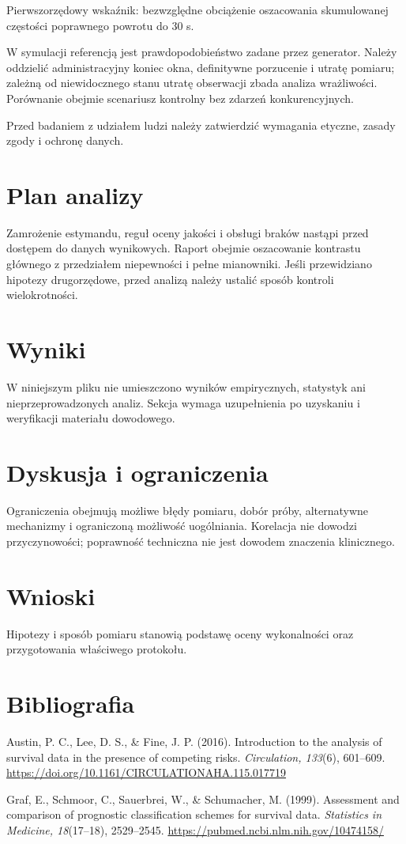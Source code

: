 \documentclass[11pt,a4paper]{article}
\begin{document}
Pierwszorzędowy wskaźnik: bezwzględne obciążenie oszacowania skumulowanej częstości poprawnego powrotu do 30 s.

W symulacji referencją jest prawdopodobieństwo zadane przez generator. Należy oddzielić administracyjny koniec okna, definitywne porzucenie i utratę pomiaru; zależną od niewidocznego stanu utratę obserwacji zbada analiza wrażliwości. Porównanie obejmie scenariusz kontrolny bez zdarzeń konkurencyjnych.

Przed badaniem z udziałem ludzi należy zatwierdzić wymagania etyczne, zasady zgody i ochronę danych.

\section{Plan analizy}

Zamrożenie estymandu, reguł oceny jakości i obsługi braków nastąpi przed dostępem do danych wynikowych. Raport obejmie oszacowanie kontrastu głównego z przedziałem niepewności i pełne mianowniki. Jeśli przewidziano hipotezy drugorzędowe, przed analizą należy ustalić sposób kontroli wielokrotności.

\section{Wyniki}

W niniejszym pliku nie umieszczono wyników empirycznych, statystyk ani nieprzeprowadzonych analiz. Sekcja wymaga uzupełnienia po uzyskaniu i weryfikacji materiału dowodowego.

\section{Dyskusja i ograniczenia}

Ograniczenia obejmują możliwe błędy pomiaru, dobór próby, alternatywne mechanizmy i ograniczoną możliwość uogólniania. Korelacja nie dowodzi przyczynowości; poprawność techniczna nie jest dowodem znaczenia klinicznego.

\section{Wnioski}

Hipotezy i sposób pomiaru stanowią podstawę oceny wykonalności oraz przygotowania właściwego protokołu.

\section*{Bibliografia}

{\setlength{\parindent}{0pt}
\setlength{\parskip}{5pt}
\hangindent=1.27cm
Austin, P. C., Lee, D. S., \& Fine, J. P. (2016). Introduction to the analysis of survival data in the presence of competing risks. \textit{Circulation, 133}(6), 601--609. \url{https://doi.org/10.1161/CIRCULATIONAHA.115.017719}\par
\hangindent=1.27cm
Graf, E., Schmoor, C., Sauerbrei, W., \& Schumacher, M. (1999). Assessment and comparison of prognostic classification schemes for survival data. \textit{Statistics in Medicine, 18}(17--18), 2529--2545. \url{https://pubmed.ncbi.nlm.nih.gov/10474158/}\par
}
\end{document}
